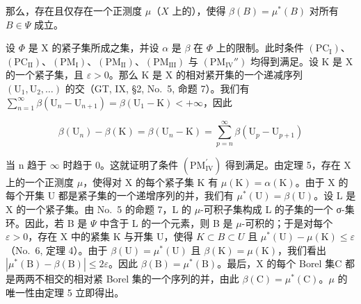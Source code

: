 那么，存在且仅存在一个正测度 \(\mu\)（\(X\) 上的），使得 \(\beta(B) = \mu^{*}(B)\) 对所有 \(B \in \Psi\) 成立。

设 \(\Phi\) 是 X 的紧子集所成之集，并设 \(\alpha\) 是 \(\beta\) 在 \(\Phi\) 上的限制。此时条件 \((\mathrm{PC_I})\)、\((\mathrm{PC_{II}})\)、\((\mathrm{PM_I})\)、\((\mathrm{PM_{II}})\)、\((\mathrm{PM_{III}})\) 与 \((\mathrm{PM_{IV}''})\) 均得到满足。设 K 是 X 的一个紧子集，且 \(\varepsilon > 0\)。那么 K 是 X 的相对紧开集的一个递减序列 \((\mathrm{U}_1, \mathrm{U}_2, \ldots)\) 的交（GT, IX, §2, No.~5, 命题 7）。我们有 \(\sum_{n=1}^{\infty} \beta(\mathrm{U}_n - \mathrm{U}_{n+1}) = \beta(\mathrm{U}_1 - \mathrm{K}) < +\infty\)，因此

\[
\beta (\mathrm{U} _ {n}) - \beta (\mathrm{K}) = \beta (\mathrm{U} _ {n} - \mathrm{K}) = \sum_ {p = n} ^ {\infty} \beta (\mathrm{U} _ {p} - \mathrm{U} _ {p + 1})
\]

当 n 趋于 \(\infty\) 时趋于 0。这就证明了条件 \((\mathrm{PM}_{\mathrm{IV}}^{\prime})\) 得到满足。由定理 5，存在 X 上的一个正测度 \(\mu\)，使得对 X 的每个紧子集 K 有 \(\mu(\mathrm{K}) = \alpha(\mathrm{K})\)。由于 X 的每个开集 U 都是紧子集的一个递增序列的并，我们有 \(\mu^{*}(\mathrm{U}) = \beta(\mathrm{U})\)。设 L 是 X 的一个紧子集。由 No.~5 的命题 7，L 的 \(\mu\)-可积子集构成 L 的子集的一个 σ-集环。因此，若 B 是 \(\Psi\) 中含于 L 的一个元素，则 B 是 \(\mu\)-可积的；于是对每个 \(\varepsilon > 0\)，存在 X 中的紧集 K 与开集 U，使得 \(K \subset B \subset U\) 且 \(\mu^{*}(\mathrm{U}) - \mu(\mathrm{K}) \leqslant \varepsilon\)（No.~6, 定理 4）。由于 \(\beta(\mathrm{U}) = \mu^{*}(\mathrm{U})\) 且 \(\beta(\mathrm{K}) = \mu(\mathrm{K})\)，我们看出 \(|\mu^{*}(\mathrm{B}) - \beta(\mathrm{B})| \leqslant 2\varepsilon\)。因此 \(\beta(\mathrm{B}) = \mu^{*}(\mathrm{B})\)。最后，X 的每个 Borel 集C 都是两两不相交的相对紧 Borel 集的一个序列的并，由此 \(\beta(\mathrm{C}) = \mu^{*}(\mathrm{C})\)。\(\mu\) 的唯一性由定理 5 立即得出。

